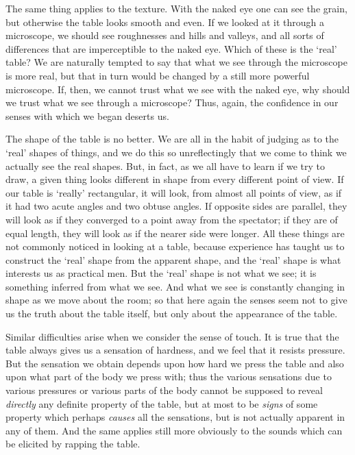 \documentclass[oneside,letterpaper,12pt]{book}
\begin{document}
The same thing applies to the texture. With the naked eye one can see
the grain, but otherwise the table looks smooth and even. If we looked
at it through a microscope, we should see roughnesses and hills and
valleys, and all sorts of differences that are imperceptible to the
naked eye. Which of these is the `real'
table? We are naturally tempted to say that what we see through the
microscope is more real, but that in turn would be changed by a still
more powerful microscope. If, then, we cannot trust what we see with the
naked eye, why should we trust what we see through a microscope? Thus,
again, the confidence in our senses with which we began deserts us.

The shape of the table is no better. We are all in the habit of judging
as to the `real' shapes of things, and
we do this so unreflectingly that we come to think we actually see the
real shapes. But, in fact, as we all have to learn if we try to draw, a
given thing looks different in shape from every different point of view.
If our table is `really' rectangular,
it will look, from almost all points of view, as if it had two acute
angles and two obtuse angles. If opposite sides are parallel, they will
look as if they converged to a point away from the spectator; if they
are of equal length, they will look as if the nearer side were longer.
All these things are not commonly noticed in looking at a table, because
experience has taught us to construct the
`real' shape from the apparent shape,
and the `real' shape is what interests
us as practical men. But the `real'
shape is not what we see; it is something inferred from what we see. And
what we see is constantly changing in shape as we move about the room;
so that here again the senses seem not to give us the truth about the
table itself, but only about the appearance of the table.

Similar difficulties arise when we consider the sense of touch. It is
true that the table always gives us a sensation of hardness, and we feel
that it resists pressure. But the sensation we obtain depends upon how
hard we press the table and also upon what part of the body we press
with; thus the various sensations due to various pressures or various
parts of the body cannot be supposed to reveal \emph{directly} any
definite property of the table, but at most to be \emph{signs} of some
property which perhaps \emph{causes} all the sensations, but is not
actually apparent in any of them. And the same applies still more
obviously to the sounds which can be elicited by rapping the table.
\end{document}
